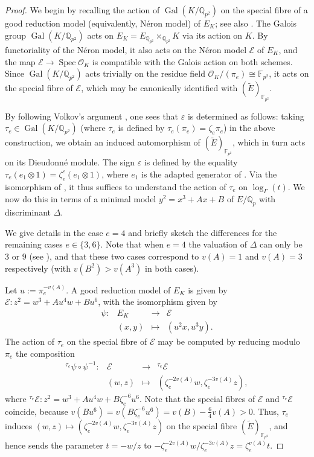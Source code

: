 \documentclass{amsart}
\theoremstyle{definition}
\newcommand{\Q}{\mathbb{Q}}
\newcommand{\Gal}{\operatorname{Gal}}
\numberwithin{theorem}{section}
\numberwithin{equation}{section}
\begin{document}
\begin{proof}
   We begin by recalling the action of $\Gal(K/\Q_{p^2})$ on the special fibre of a good reduction model (equivalently, Néron model) of $E_K$; see also \cite[p.~497]{MR236190}.
    The Galois group $\Gal(K/\Q_{p^2})$ acts on $E_K = E_{\Q_{p^2}} \times_{\Q_{p^2}} K$ via its action on $K$. By functoriality of the Néron model, it also acts on the Néron model $\mathcal{E}$ of $E_K$, and the map $\mathcal{E} \to \operatorname{Spec} \mathcal{O}_K$ is compatible with the Galois action on both schemes. Since $\operatorname{Gal}(K/\mathbb{Q}_{p^2})$ acts trivially on the residue field $\mathcal{O}_K/(\pi_e) \cong \mathbb{F}_{p^2}$, it acts on the special fibre of $\mathcal{E}$, which may be canonically identified with $(\tilde{E})_{\mathbb{F}_{p^2}}$. 

    By following Volkov's argument \cite[p.~95]{Volkov}, one sees that $\varepsilon$ is determined as follows: taking $\tau_e \in \Gal(K/\Q_{p^2})$ (where $\tau_e$ is defined by $\tau_e(\pi_e)=\zeta_e\pi_e$) in the above construction, we obtain an induced automorphism of $(\tilde{E})_{\mathbb{F}_{p^2}}$, which in turn acts on its Dieudonné module. The sign $\varepsilon$ is defined by the equality $\tau_e (e_1 \otimes 1) = \zeta_e^{\varepsilon} (e_1 \otimes 1)$, where $e_1$ is the adapted generator of . Via the isomorphism of , it thus suffices to understand the action of $\tau_e$ on $\log_\Gamma(t)$. We now do this in terms of a minimal model $y^2 = x^3+Ax+B$ of $E/\Q_p$ with discriminant $\Delta$.
    
    We give details in the case $e=4$ and briefly sketch the differences for the remaining cases $e \in \{3, 6\}$. Note that when $e=4$ the valuation of $\Delta$ can only be $3$ or $9$ (see \cite[Table 15.1]{MR2514094}), and that these two cases correspond to $v(A)=1$ and $v(A)=3$ respectively (with $v(B^2) > v(A^3)$ in both cases).

    Let $u := \pi_e^{-v(A)}$. A good reduction model of $E_K$ is given by $\mathcal{E} : z^2 = w^3 + Au^4 w + Bu^6$, with the isomorphism given by 
    \[
    \begin{array}{cccc}
    \psi :& E_K & \to & \mathcal{E} \\
     & (x,y) & \mapsto & ( u^2x, u^3y).
    \end{array}
    \]
    The action of $\tau_e$ on the special fibre of $\mathcal{E}$ may be computed by reducing modulo $\pi_e$ the composition
\[
\begin{array}{cccc}
{}^{\tau_e} \psi \circ \psi^{-1} : & \mathcal{E}  & \to & {}^{\tau_e} \mathcal{E} \\
& (w, z) & \mapsto & (\zeta_e^{-2v(A)}w, \zeta_e^{-3v(A)}z),
\end{array}
\]
where ${}^{\tau_e} \mathcal{E} : z^2 = w^3 + Au^4 w + B\zeta_e^{-6} u^6$. Note that the special fibres of $\mathcal{E}$ and ${}^{\tau_e}\mathcal{E}$ coincide, because $v(Bu^6)=v(B\zeta_e^{-6} u^6)=v(B) - \frac{6}{4}v(A)>0$. Thus, $\tau_e$ induces $(w,z) \mapsto (\zeta_e^{-2v(A)}w, \zeta_e^{-3v(A)}z)$ on the special fibre $(\tilde{E})_{\mathbb{F}_{p^2}}$, and hence sends the parameter $t = -w/z$ to $-\zeta_e^{-2v(A)}w / \zeta_e^{-3v(A)}z =\zeta_e^{v(A)} t$. 


\end{proof}
\end{document}
